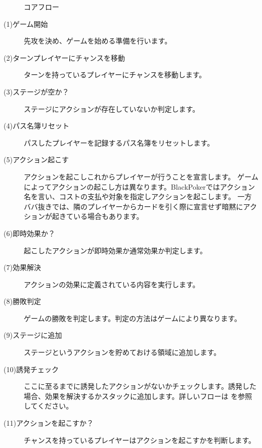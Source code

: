\documentclass[letterpaper,10pt,dvipdfmx]{sphinxmanual}
\begin{document}
\begin{figure}[htbp]
\centering
\capstart

\noindent{}
\caption{コアフロー}\label{\detokenize{core/core:id19}}\label{\detokenize{core/core:coreflow-2}}\end{figure}
\begin{description}
\item[{(1)ゲーム開始}] \leavevmode
先攻を決め、ゲームを始める準備を行います。

\item[{(2)ターンプレイヤーにチャンスを移動}] \leavevmode
ターンを持っているプレイヤーにチャンスを移動します。

\item[{(3)ステージが空か？}] \leavevmode
ステージにアクションが存在していないか判定します。

\item[{(4)パス名簿リセット}] \leavevmode
パスしたプレイヤーを記録するパス名簿をリセットします。

\item[{(5)アクション起こす}] \leavevmode
アクションを起こしこれからプレイヤーが行うことを宣言します。
ゲームによってアクションの起こし方は異なります。BlackPokerではアクション名を言い、コストの支払や対象を指定しアクションを起こします。
一方ババ抜きでは、隣のプレイヤーからカードを引く際に宣言せず暗黙にアクションが起きている場合もあります。

\item[{(6)即時効果か？}] \leavevmode
起こしたアクションが即時効果か通常効果か判定します。

\item[{(7)効果解決}] \leavevmode
アクションの効果に定義されている内容を実行します。

\item[{(8)勝敗判定}] \leavevmode
ゲームの勝敗を判定します。判定の方法はゲームにより異なります。

\item[{(9)ステージに追加}] \leavevmode
ステージというアクションを貯めておける領域に追加します。

\item[{(10)誘発チェック}] \leavevmode
ここに至るまでに誘発したアクションがないかチェックします。誘発した場合、効果を解決するかスタックに追加します。詳しいフローは  を参照してください。

\item[{(11)アクションを起こすか？}] \leavevmode
チャンスを持っているプレイヤーはアクションを起こすかを判断します。


\end{description}
\end{document}
